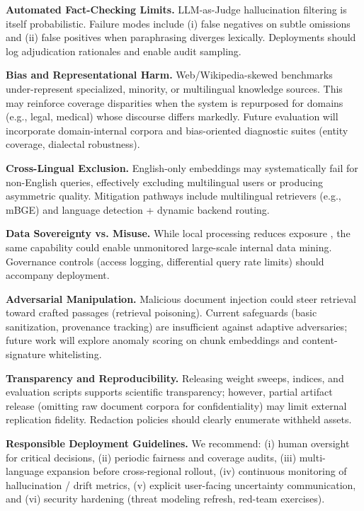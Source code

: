 \documentclass[conference]{IEEEtran}
\begin{document}
	\textbf{Automated Fact-Checking Limits.} LLM-as-Judge hallucination filtering \cite{llm_judge} is itself probabilistic. Failure modes include (i) false negatives on subtle omissions and (ii) false positives when paraphrasing diverges lexically. Deployments should log adjudication rationales and enable audit sampling.

	\textbf{Bias and Representational Harm.} Web/Wikipedia-skewed benchmarks under-represent specialized, minority, or multilingual knowledge sources. This may reinforce coverage disparities when the system is repurposed for domains (e.g., legal, medical) whose discourse differs markedly. Future evaluation will incorporate domain-internal corpora and bias-oriented diagnostic suites (entity coverage, dialectal robustness).

	\textbf{Cross-Lingual Exclusion.} English-only embeddings may systematically fail for non-English queries, effectively excluding multilingual users or producing asymmetric quality. Mitigation pathways include multilingual retrievers (e.g., mBGE) and language detection + dynamic backend routing.

	\textbf{Data Sovereignty vs. Misuse.} While local processing reduces exposure \cite{privacyinternational,edpb}, the same capability could enable unmonitored large-scale internal data mining. Governance controls (access logging, differential query rate limits) should accompany deployment.

	\textbf{Adversarial Manipulation.} Malicious document injection could steer retrieval toward crafted passages (retrieval poisoning). Current safeguards (basic sanitization, provenance tracking) are insufficient against adaptive adversaries; future work will explore anomaly scoring on chunk embeddings and content-signature whitelisting.

	\textbf{Transparency and Reproducibility.} Releasing weight sweeps, indices, and evaluation scripts supports scientific transparency; however, partial artifact release (omitting raw document corpora for confidentiality) may limit external replication fidelity. Redaction policies should clearly enumerate withheld assets.

	\textbf{Responsible Deployment Guidelines.} We recommend: (i) human oversight for critical decisions, (ii) periodic fairness and coverage audits, (iii) multi-language expansion before cross-regional rollout, (iv) continuous monitoring of hallucination / drift metrics, (v) explicit user-facing uncertainty communication, and (vi) security hardening (threat modeling refresh, red-team exercises).
\end{document}
